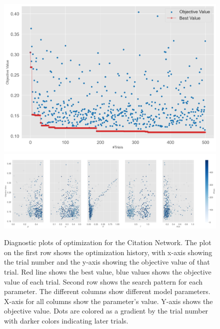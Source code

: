 \documentclass[11pt]{article}
\begin{document}
\begin{figure}[H]
    \centering
    \includegraphics[width=.7\linewidth]{../plots/overall/Optimization_History_netscience.png}
    \includegraphics[width=.7\linewidth]{../plots/overall/Plot_Slice_netscience.png}
  \caption{Diagnostic plots of optimization for the Citation Network. The plot on the first row shows the optimization history, with x-axis showing the trial number and the y-axis showing the objective value of that trial. Red line shows the best value, blue values shows the objective value of each trial. Second row shows the search pattern for each parameter. The different columns show different model parameters. X-axis for all columns show the parameter's value. Y-axis shows the objective value. Dots are colored as a gradient by the trial number with darker colors indicating later trials.}
  \label{appendix:optimization_netscience}
\end{figure}
\end{document}
